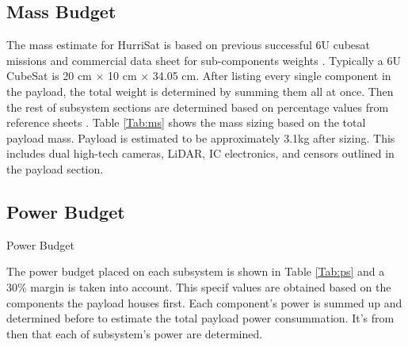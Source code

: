 \subsection{Mass Budget }
The mass estimate for HurriSat is based on previous successful 6U cubesat missions and commercial data sheet for sub-components weights \cite{Cipera2018}. Typically a 6U CubeSat is 20 cm × 10 cm × 34.05 cm. After listing every single component in the payload, the total weight is determined by summing them all at once. Then the rest of subsystem sections are determined based on percentage values from reference sheets \cite{NASA2018}.  Table \ref{Tab:ms} shows the mass sizing based on the total payload mass. Payload is estimated to be approximately 3.1kg after sizing. This includes dual high-tech cameras, LiDAR, IC electronics, and censors outlined in the payload section.

\subsection{Power Budget }
\caption{Power Budget}
The power budget placed on each subsystem is shown in Table \ref{Tab:ps} and a 30\% margin is taken into account. This specif values are obtained based on the components the payload houses first. Each component's power is summed up and determined before to estimate the total payload power consummation. It's from then that each of subsystem's power are determined. \\

